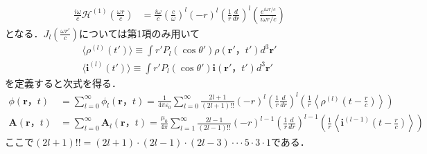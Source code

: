 \documentclass[a4j,10pt,oneside,openany]{jsbook}
\newcommand{\vi}{\boldsymbol{i}}
\newcommand{\vr}{\boldsymbol{r}}
\newcommand{\vA}{\boldsymbol{A}}
\begin{document}
{\begin{align}
  \frac{i\omega}{c}{\mathcal{H}}^{(1)}(\frac{\omega r}{c}) &=\frac{i\omega}{c} (\frac{c}{\omega})^l (-r)^l \left(\frac{1}{r}\frac{d}{dr}\right)^l \left( \frac{e^{i\omega r/c}}{i\omega r/c}\right)
\end{align}
となる．$J_l(\frac{\omega r'}{c})$については第1項のみ用いて
\begin{align}
  \langle\rho^{(l)}(t')\rangle \equiv \int r'P_l(\cos\theta')\rho(\vr'，t')d^3\vr'\\
  \langle\vi^{(l)}(t')\rangle \equiv \int r'P_l(\cos\theta')\vi(\vr'，t')d^3\vr'
\end{align}
を定義すると次式を得る．
\begin{align}
  \phi(\vr，t)&=\sum_{l=0}^\infty\phi_l(\vr，t)=\frac{1}{4\pi\varepsilon_0}\sum_{l=0}^\infty\frac{2l+1}{(2l+1)!!}(-r)^l\left(\frac{1}{r}\frac{d}{dr}\right)^l \left(\frac{1}{r}\left\langle\rho^{(l)}(t-\frac{r}{c})\right\rangle\right)\label{eq:phi_pot}\\
  \vA(\vr，t)&=\sum_{l=0}^\infty \vA_l(\vr，t)=\frac{\mu_0}{4\pi}\sum_{l=1}^\infty\frac{2l-1}{(2l-1)!!}(-r)^{l-1}\left(\frac{1}{r}\frac{d}{dr}\right)^{l-1}\left(\frac{1}{r}\left\langle\vi^{(l-1)}(t-\frac{r}{c})\right\rangle\right)\label{eq:A_pot}
\end{align}
ここで$(2l+1)!!=(2l+1)\cdot(2l-1)\cdot(2l-3)\cdot\cdot\cdot 5\cdot 3\cdot 1$である．

}
\end{document}
